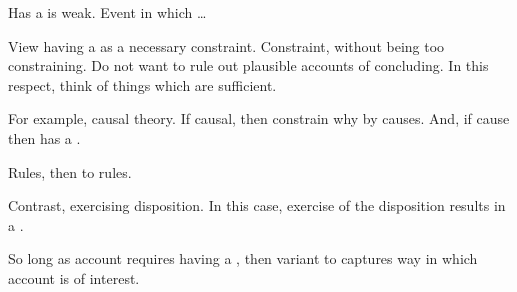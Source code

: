 \begin{note}
  Has a  is weak.
  Event in which \dots

  View having a  as a necessary constraint.
  Constraint, without being too constraining.
  Do not want to rule out plausible accounts of concluding.
  In this respect, think of things which are sufficient.

  For example, causal theory.
  If causal, then constrain why by causes.
  And, if cause then has a .

  Rules, then  to rules.

  Contrast, exercising disposition.
  In this case, exercise of the disposition results in a .

  So long as account requires having a , then variant to \qHow{} captures way in which account is of interest.
\end{note}


